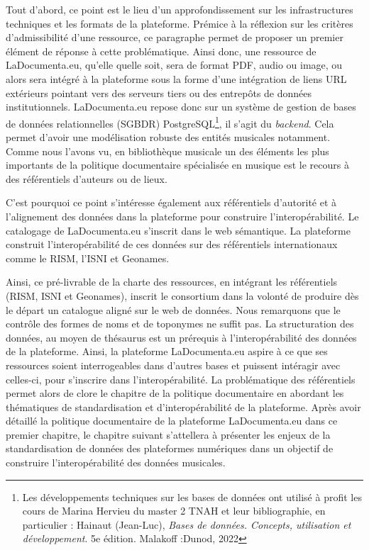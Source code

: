 \begin{itemize}
\begin{itemize}
		
		Tout d'abord, ce point est le lieu d'un approfondissement sur les infrastructures techniques et les formats de la plateforme. Prémice à la réflexion sur les critères d'admissibilité d'une ressource, ce paragraphe permet de proposer un premier élément de réponse à cette problématique. Ainsi donc, une ressource de LaDocumenta.eu, qu'elle quelle soit,  sera de format PDF, audio ou image, ou alors sera intégré à la plateforme sous la forme d'une intégration de liens URL extérieurs pointant vers des serveurs tiers ou des entrepôts de données institutionnels. 
		LaDocumenta.eu repose donc sur un système de gestion de bases de données relationnelles (SGBDR) PostgreSQL\footnote{Les développements techniques sur les bases de données ont utilisé à profit les cours de Marina Hervieu du master 2 TNAH et leur bibliographie, en particulier : Hainaut (Jean-Luc), \textit{Bases de données. Concepts, utilisation et développement}. 5e édition. Malakoff :Dunod, 2022}, il s'agit du \textit{backend}.
		Cela permet d'avoir une modélisation robuste des entités musicales notamment.  
		Comme nous l'avons vu, en bibliothèque musicale un des éléments les plus importants de la politique documentaire spécialisée en musique est le recours à des référentiels d'auteurs ou de lieux.
		
		C'est pourquoi ce point s'intéresse également aux référentiels d'autorité et à l'alignement des données dans la plateforme pour construire l'interopérabilité. 
		Le catalogage de LaDocumenta.eu s'inscrit dans le web sémantique. La plateforme construit l'interopérabilité de ces données sur des référentiels internationaux comme le RISM, l'ISNI et Geonames.
		
	\end{itemize}
	
\end{itemize}


Ainsi, ce pré-livrable de la charte des ressources, en intégrant les référentiels (RISM, ISNI et Geonames), inscrit le consortium dans la volonté de produire dès le départ un catalogue aligné sur le web de données. 
Nous remarquons que le contrôle des formes de noms et de toponymes ne suffit pas. La structuration des données, au moyen de thésaurus est un prérequis à l'interopérabilité des données de la plateforme. 
Ainsi, la plateforme LaDocumenta.eu aspire à ce que ses ressources soient interrogeables dans d'autres bases et puissent intéragir avec celles-ci, pour s'inscrire dans l'interopérabilité. 
La problématique des référentiels permet alors de clore le chapitre de la politique documentaire en abordant les thématiques de standardisation et d'interopérabilité de la plateforme. Après avoir détaillé la politique documentaire de la plateforme LaDocumenta.eu dans ce premier chapitre, le chapitre suivant s'attellera à présenter les enjeux de la standardisation de données des plateformes numériques dans un objectif de construire l'interopérabilité des données musicales. 	
